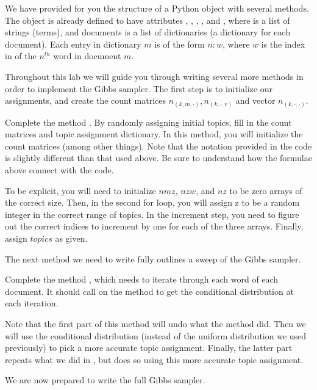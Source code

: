 We have provided for you the structure of a Python object  with several methods. The object is already defined to have attributes , , , , and , where  is a list of strings (terms), and documents is a list of dictionaries (a dictionary for each document). Each entry in dictionary $m$ is of the form $n : w$, where $w$ is the index in  of the $n^{th}$ word in document $m$.

Throughout this lab we will guide you through writing several more methods in order to implement the Gibbs sampler. The first step is to initialize our assignments, and create the count matrices $n_{(k,m,\cdot)}, n_{(k,\cdot,v)}$ and vector $n_{(k,\cdot,\cdot)}$.

\begin{problem}
Complete the method . By randomly assigning initial topics, fill in the count matrices and topic assignment dictionary. In this method, you will initialize the count matrices (among other things). Note that the notation
provided in the code is slightly different than that used above. Be sure to understand how the formulae above
connect with the code.

To be explicit, you will need to initialize $nmz$, $nzw$, and $nz$ to be zero arrays of the correct size.  Then, in the second for loop, you will assign z to be a random integer in the correct range of topics.  In the increment step, you need to figure out the correct indices to increment by one for each of the three arrays.  Finally, assign $topics$ as given.
\end{problem}

The next method we need to write fully outlines a sweep of the Gibbs sampler.

\begin{problem}
Complete the method , which needs to iterate through each word of each document. It should call on the method  to get the conditional distribution at each iteration.

Note that the first part of this method will undo what the  method did.  Then we will use the conditional distribution (instead of the uniform distribution we used previously) to pick a more accurate topic assignment.  Finally, the latter part repeats what we did in , but does so using this more accurate topic assignment. 
\end{problem}

We are now prepared to write the full Gibbs sampler.

